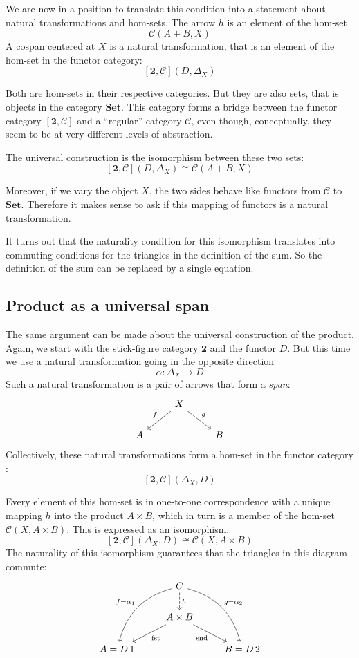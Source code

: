 \documentclass[DaoFP]{subfiles}
\begin{document}
We are now in a position to translate this condition into a statement about natural transformations and hom-sets. The arrow $h$ is an element of the hom-set 
\[ \mathcal{C}(A + B, X)\]
A cospan centered at $X$ is a natural transformation, that is an element of the hom-set in the functor category:
\[ [\mathbf{2}, \mathcal{C}](D, \Delta_X) \]

Both are hom-sets in their respective categories. But they are also sets, that is objects in the category $\mathbf{Set}$. This category forms a bridge between the functor category $[\mathbf{2}, \mathcal{C}]$ and a ``regular'' category $\mathcal{C}$, even though, conceptually, they seem to be at very different levels of abstraction. 

The universal construction is the isomorphism between these two sets:
\[ [\mathbf{2}, \mathcal{C}](D, \Delta_X)  \cong \mathcal{C}(A + B, X) \]

Moreover, if we vary the object $X$, the two sides behave like functors from  $\mathcal{C}$ to $\mathbf{Set}$. Therefore it makes sense to ask if this mapping of functors is a natural transformation. 

It turns out that the naturality condition for this isomorphism translates into commuting conditions for the triangles in the definition of the sum. So the definition of the sum can be replaced by a single equation.

\subsection{Product as a universal span}

The same argument can be made about the universal construction of the product. Again, we start with the stick-figure category $\mathbf{2}$ and the functor $D$. But this time we use a natural transformation going in the opposite direction
\[ \alpha \colon \Delta_X \to D \]
Such a natural transformation is a pair of arrows that form a \emph{span}:
\[
 \begin{tikzcd}
 &X
 \arrow[dl, "f"']
 \arrow[dr, "g"]
 \\
 A
 && B
  \end{tikzcd}
\]
Collectively, these natural transformations form a hom-set in the functor category :
\[[\mathbf{2}, \mathcal{C}](\Delta_X, D) \]

Every element of this hom-set is in one-to-one correspondence with a unique mapping $h$ into the product $A \times B$, which in turn is a member of the hom-set $\mathcal{C}(X, A \times B)$. This is expressed as an isomorphism:
\[ [\mathbf{2}, \mathcal{C}](\Delta_X, D)  \cong \mathcal{C}(X, A \times B) \]
The naturality of this isomorphism guarantees that the triangles in this diagram commute:
\[
 \begin{tikzcd}
 & C 
\arrow[d, dashed, "h"]
 \arrow[ddl, bend right, "f = \alpha_1"']
 \arrow[ddr, bend left, "g = \alpha_2"]
\\
&A \times B
 \arrow[dl,  "\text{fst}"]
  \arrow[dr,   "\text{snd}"']
\\
A = D\, 1 && B = D \, 2
 \end{tikzcd}
\]
\end{document}
